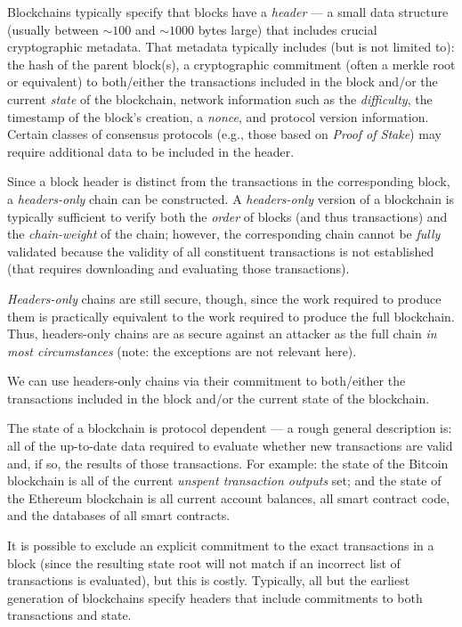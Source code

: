 \documentclass[a4paper,]{article}
\begin{document}
Blockchains typically specify that blocks have a \emph{header} --- a small data structure (usually between $\sim 100$ and $\sim 1000$ bytes large) that includes crucial cryptographic metadata.
That metadata typically includes (but is not limited to): the hash of the parent block(s), a cryptographic commitment (often a merkle root or equivalent) to both/either the transactions included in the block and/or the current \emph{state} of the blockchain, network information such as the \emph{difficulty}, the timestamp of the block's creation, a \emph{nonce}, and protocol version information.
Certain classes of consensus protocols (e.g., those based on \emph{Proof of Stake}) may require additional data to be included in the header.

Since a block header is distinct from the transactions in the corresponding block, a \emph{headers-only} chain can be constructed.
A \emph{headers-only} version of a blockchain is typically sufficient to verify both the \emph{order} of blocks (and thus transactions) and the \emph{chain-weight} of the chain; however, the corresponding chain cannot be \emph{fully} validated because the validity of all constituent transactions is not established (that requires downloading and evaluating those transactions).

\emph{Headers-only} chains are still secure, though, since the work required to produce them is practically equivalent to the work required to produce the full blockchain.
Thus, headers-only chains are as secure against an attacker as the full chain \emph{in most circumstances} (note: the exceptions are not relevant here).

We can use headers-only chains via their commitment to both/either the transactions included in the block and/or the current state of the blockchain.

The state of a blockchain is protocol dependent --- a rough general description is: all of the up-to-date data required to evaluate whether new transactions are valid and, if so, the results of those transactions.
For example: the state of the Bitcoin blockchain is all of the current \emph{unspent transaction outputs} set; and the state of the Ethereum blockchain is all current account balances, all smart contract code, and the databases of all smart contracts.

It is possible to exclude an explicit commitment to the exact transactions in a block (since the resulting state root will not match if an incorrect list of transactions is evaluated), but this is costly.
Typically, all but the earliest generation of blockchains specify headers that include commitments to both transactions and state.
\end{document}

